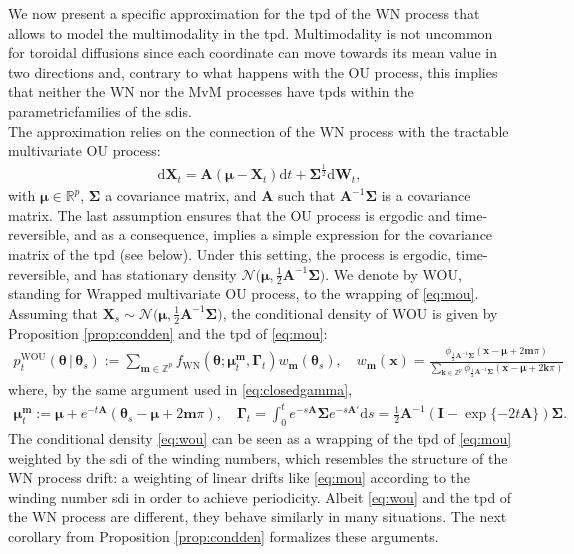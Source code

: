 \documentclass[oneside,11pt]{article}
\newcommand{\R}{\mathbb{R}}
\newcommand{\Z}{\mathbb{Z}}
\newcommand{\rd}{\mathrm{d}}
\newcommand{\bx}{\mathbf{x}}
\newcommand{\bm}{\mathbf{m}}
\newcommand{\bX}{\mathbf{X}}
\newcommand{\bmu}{\boldsymbol\mu}
\newcommand{\bk}{\mathbf{k}}
\newcommand{\btheta}{\boldsymbol\theta}
\newcommand{\bSigma}{\boldsymbol\Sigma}
\newcommand{\bGamma}{\boldsymbol\Gamma}
\newcommand{\bA}{\mathbf{A}}
\newcommand{\bI}{\mathbf{I}}
\newcommand{\bW}{\mathbf{W}}
\begin{document}
We now present a specific approximation for the tpd of the WN process that allows to model the multimodality in the tpd. Multimodality is not uncommon for toroidal diffusions since each coordinate can move towards its mean value in two directions and, contrary to what happens with the OU process, this implies that neither the WN nor the MvM processes have tpds within the parametric\nopagebreak[4] families of the sdis.\\

The approximation relies on the connection of the WN process with the tractable multivariate OU process:
\begin{align}
\rd\bX_t=\bA(\bmu-\bX_t)\rd t+\bSigma^\frac{1}{2}\rd \bW_t,\label{eq:mou}
\end{align}
with $\bmu\in\R^p$, $\bSigma$ a covariance matrix, and $\bA$ such that $\bA^{-1}\bSigma$ is a covariance matrix. The last
  assumption ensures that the OU process is ergodic and time-reversible,
and as a consequence, implies a simple expression for the
  covariance matrix of the tpd (see below). Under this setting, the process is ergodic, time-reversible, and has stationary density $\mathcal{N}\big(\bmu,\frac{1}{2}\bA^{-1}\bSigma\big)$. We denote by WOU, standing for Wrapped multivariate OU process, to the wrapping of \eqref{eq:mou}. Assuming that $\bX_s\sim \mathcal{N}\big(\bmu,\frac{1}{2}\bA^{-1}\bSigma\big)$, the conditional density of WOU is given by Proposition \ref{prop:condden} and the tpd of \eqref{eq:mou}:
\begin{align}
p^\mathrm{WOU}_t(\btheta\,|\,\btheta_s) := \sum_{\bm\in\Z^p} f_\mathrm{WN}(\btheta;\bmu^\bm_t,\bGamma_t)w_{\bm}(\btheta_s), \quad w_{\bm}(\bx)=\frac{\phi_{\frac{1}{2}\bA^{-1}\bSigma}(\bx-\bmu+2\bm\pi )}{\sum_{\bk\in\Z^p}
  \phi_{\frac{1}{2}\bA^{-1}\bSigma}(\bx-\bmu+2\bk\pi)}\label{eq:wou}
\end{align}
where, by the same argument used in \eqref{eq:closedgamma},
\begin{align*}
\bmu^\bm_t := \bmu + e^{-t\bA }(\btheta_s - \bmu + 2\bm\pi ),\quad \bGamma_t=\int_0^te^{-s\bA}\bSigma e^{-s\bA'}\rd s=\frac{1}{2}\bA^{-1}(\bI-\exp\{-2t\bA\})\bSigma.
\end{align*}
The conditional density \eqref{eq:wou} can be seen as a wrapping of the tpd of \eqref{eq:mou} weighted by the sdi of the winding numbers, which resembles the structure of the WN process drift: a weighting of linear drifts like \eqref{eq:mou} according to the winding number sdi in order to achieve periodicity. Albeit \eqref{eq:wou} and the tpd of the WN process are different, they behave similarly in many situations. The next corollary from Proposition \ref{prop:condden} formalizes these arguments.
\end{document}
